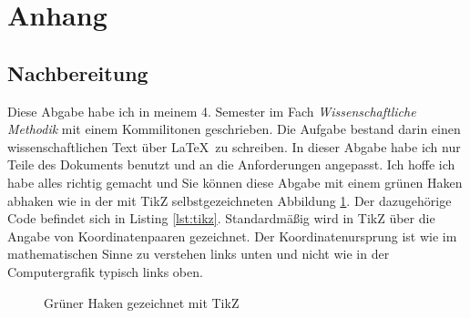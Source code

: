 \appendix 
\section*{Anhang}   \label{chap:appendix}

\renewcommand{\thesubsection}{\Alph{subsection}}
\renewcommand{\thefigure}{\thesubsection.\arabic{figure}}
\renewcommand{\theHfigure}{\thesubsection.\arabic{figure}}
\renewcommand{\thelisting}{\thesubsection.\arabic{listing}}
\setcounter{figure}{0}
\setcounter{listing}{0}

\subsection{Nachbereitung}
  
Diese Abgabe habe ich in meinem 4. Semester im Fach \textit{Wissenschaftliche Methodik} mit einem Kommilitonen geschrieben. Die Aufgabe bestand darin einen wissenschaftlichen Text über \LaTeX\ zu schreiben. In dieser Abgabe habe ich nur Teile des Dokuments benutzt und an die Anforderungen angepasst.
Ich hoffe ich habe alles richtig gemacht und Sie können diese Abgabe mit einem grünen Haken abhaken wie in der mit TikZ selbstgezeichneten Abbildung \ref{fig:tikz}.
Der dazugehörige Code befindet sich in Listing \ref{lst:tikz}.
Standardmäßig wird in TikZ über die Angabe von Koordinatenpaaren gezeichnet. Der Koordinatenursprung ist wie im mathematischen Sinne zu verstehen links unten und nicht wie in der Computergrafik typisch links oben. \cite[vgl.][S.343ff]{Vosz2018}
\begin{figure}[htb]
    \centering
    \label{fig:tikz}
    \caption{Grüner Haken gezeichnet mit TikZ}
\end{figure}

\setcounter{figure}{0}